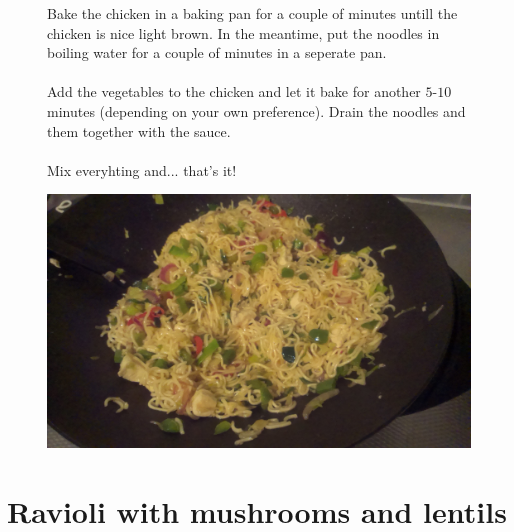\documentclass[a4paper,12pt]{report}
\begin{document}
\begin{figure}[h]

\begin{minipage}{0.5\textwidth}
Bake the chicken in a baking pan for a couple of minutes untill the chicken is nice light brown. In the meantime, put the noodles in boiling water for a couple of minutes in a seperate pan. \\
\\
Add the vegetables to the chicken and let it bake for another $5$-$10$ minutes (depending on your own preference). Drain the noodles and them together with the sauce. \\
\\
Mix everyhting and... that's it!

\end{minipage}
\begin{minipage}{0.4\textwidth}
	\includegraphics[scale=0.065]{Images/noodles.jpg}
\end{minipage}
\end{figure}

\newpage

\chapter{Ravioli with mushrooms and lentils}
\end{document}
